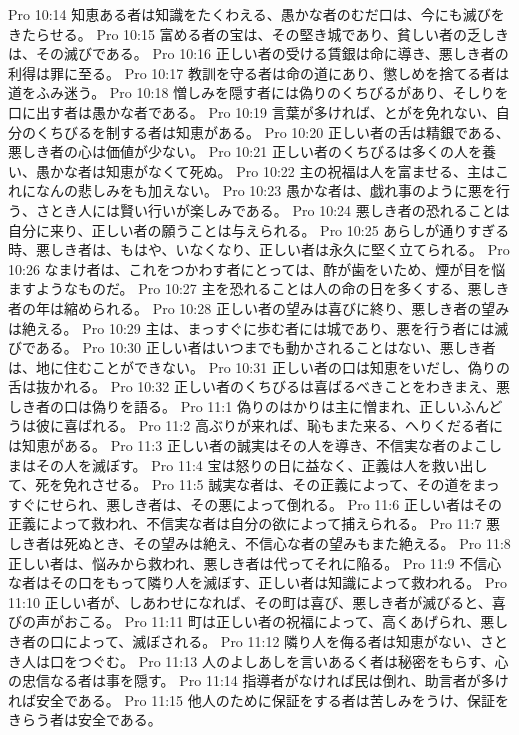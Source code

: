 Pro 10:14  知恵ある者は知識をたくわえる、愚かな者のむだ口は、今にも滅びをきたらせる。
Pro 10:15  富める者の宝は、その堅き城であり、貧しい者の乏しきは、その滅びである。
Pro 10:16  正しい者の受ける賃銀は命に導き、悪しき者の利得は罪に至る。
Pro 10:17  教訓を守る者は命の道にあり、懲しめを捨てる者は道をふみ迷う。
Pro 10:18  憎しみを隠す者には偽りのくちびるがあり、そしりを口に出す者は愚かな者である。
Pro 10:19  言葉が多ければ、とがを免れない、自分のくちびるを制する者は知恵がある。
Pro 10:20  正しい者の舌は精銀である、悪しき者の心は価値が少ない。
Pro 10:21  正しい者のくちびるは多くの人を養い、愚かな者は知恵がなくて死ぬ。
Pro 10:22  主の祝福は人を富ませる、主はこれになんの悲しみをも加えない。
Pro 10:23  愚かな者は、戯れ事のように悪を行う、さとき人には賢い行いが楽しみである。
Pro 10:24  悪しき者の恐れることは自分に来り、正しい者の願うことは与えられる。
Pro 10:25  あらしが通りすぎる時、悪しき者は、もはや、いなくなり、正しい者は永久に堅く立てられる。
Pro 10:26  なまけ者は、これをつかわす者にとっては、酢が歯をいため、煙が目を悩ますようなものだ。
Pro 10:27  主を恐れることは人の命の日を多くする、悪しき者の年は縮められる。
Pro 10:28  正しい者の望みは喜びに終り、悪しき者の望みは絶える。
Pro 10:29  主は、まっすぐに歩む者には城であり、悪を行う者には滅びである。
Pro 10:30  正しい者はいつまでも動かされることはない、悪しき者は、地に住むことができない。
Pro 10:31  正しい者の口は知恵をいだし、偽りの舌は抜かれる。
Pro 10:32  正しい者のくちびるは喜ばるべきことをわきまえ、悪しき者の口は偽りを語る。
Pro 11:1  偽りのはかりは主に憎まれ、正しいふんどうは彼に喜ばれる。
Pro 11:2  高ぶりが来れば、恥もまた来る、へりくだる者には知恵がある。
Pro 11:3  正しい者の誠実はその人を導き、不信実な者のよこしまはその人を滅ぼす。
Pro 11:4  宝は怒りの日に益なく、正義は人を救い出して、死を免れさせる。
Pro 11:5  誠実な者は、その正義によって、その道をまっすぐにせられ、悪しき者は、その悪によって倒れる。
Pro 11:6  正しい者はその正義によって救われ、不信実な者は自分の欲によって捕えられる。
Pro 11:7  悪しき者は死ぬとき、その望みは絶え、不信心な者の望みもまた絶える。
Pro 11:8  正しい者は、悩みから救われ、悪しき者は代ってそれに陥る。
Pro 11:9  不信心な者はその口をもって隣り人を滅ぼす、正しい者は知識によって救われる。
Pro 11:10  正しい者が、しあわせになれば、その町は喜び、悪しき者が滅びると、喜びの声がおこる。
Pro 11:11  町は正しい者の祝福によって、高くあげられ、悪しき者の口によって、滅ぼされる。
Pro 11:12  隣り人を侮る者は知恵がない、さとき人は口をつぐむ。
Pro 11:13  人のよしあしを言いあるく者は秘密をもらす、心の忠信なる者は事を隠す。
Pro 11:14  指導者がなければ民は倒れ、助言者が多ければ安全である。
Pro 11:15  他人のために保証をする者は苦しみをうけ、保証をきらう者は安全である。
